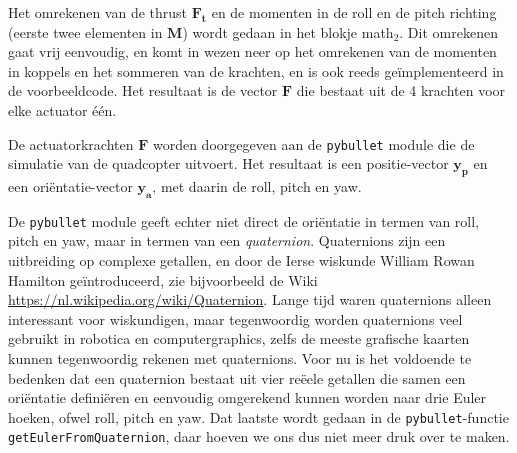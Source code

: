 \documentclass[a4paper,11pt]{article}
\begin{document}
    Het omrekenen van de thrust $\mathbf{F_t}$ en de momenten  in de roll en
    de pitch richting (eerste twee elementen in $\mathbf{M}$) wordt gedaan in
    het blokje math$_2$. Dit omrekenen gaat vrij eenvoudig, en komt in wezen
    neer op het omrekenen van de momenten in koppels en het sommeren van de
    krachten, en is ook reeds ge\"implementeerd in de voorbeeldcode.
    Het resultaat is de vector $\mathbf{F}$ die bestaat uit de 4 krachten voor
    elke actuator \'e\'en.

    De actuatorkrachten $\mathbf{F}$ worden doorgegeven aan de
    \texttt{pybullet} module die de simulatie van de quadcopter uitvoert. Het
    resultaat is een positie-vector $\mathbf{y_p}$ en een ori\"entatie-vector
    $\mathbf{y_a}$, met daarin de roll, pitch en yaw.

    De \texttt{pybullet} module geeft echter niet direct de ori\"entatie in
    termen van roll, pitch en yaw, maar in termen van een \emph{quaternion}.
    Quaternions zijn een uitbreiding op complexe getallen, en 
    door de Ierse wiskunde William Rowan Hamilton ge\"introduceerd, zie
    bijvoorbeeld de Wiki \url{https://nl.wikipedia.org/wiki/Quaternion}. Lange tijd
    waren quaternions alleen interessant voor wiskundigen, maar tegenwoordig worden quaternions veel gebruikt in robotica en computergraphics, zelfs de meeste grafische kaarten kunnen tegenwoordig rekenen met quaternions. Voor nu is het voldoende te bedenken dat een quaternion bestaat uit vier re\"eele getallen die samen een ori\"entatie defini\"eren en eenvoudig omgerekend kunnen worden naar drie Euler hoeken, ofwel roll, pitch en yaw. Dat laatste wordt gedaan in de \texttt{pybullet}-functie \texttt{getEulerFromQuaternion}, daar hoeven we ons dus niet meer druk over te maken.
\end{document}
